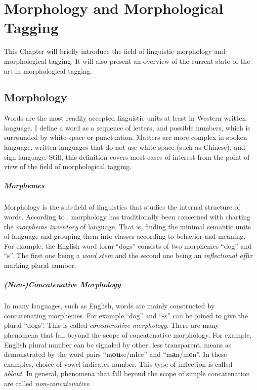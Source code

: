 \chapter{Morphology and Morphological Tagging}
\label{chap:morphology}

This Chapter will briefly introduce the field of linguistic
morphology and morphological tagging. It will also present an overview
of the current state-of-the-art in morphological tagging.

\section{Morphology}

Words are the most readily accepted linguistic units at least in
Western written language. I define a word as a sequence of letters,
and possible numbers, which is surrounded by white-space or
punctuation. Matters are more complex in spoken language, written
languages that do not use white space (such as Chinese), and sign
language. Still, this definition covers most cases of interest from
the point of view of the field of morphological tagging.

\paragraph{Morphemes} Morphology is the sub-field of linguistics that
studies the internal structure of words. According to \cite{Bybee85},
morphology has traditionally been concerned with charting the {\it
  morpheme inventory} of language. That is, finding the minimal
semantic units of language and grouping them into classes according to
behavior and meaning. For example, the English word form ``dogs''
consists of two morphemes ``dog'' and ``s''. The first one being a
{\it word stem} and the second one being an {\it inflectional affix}
marking plural number.

\paragraph{(Non-)Concatenative Morphology} In many languages, such as
English, words are mainly constructed by concatenating morphemes. For
example,``dog'' and ``-s'' can be joined to give the plural
``dogs''. This is called {\it concatenative morphology}. There are
many phenomena that fall beyond the scope of concatenative
morphology. For example, English plural number can be signaled by
other, less transparent, means as demonstrated by the word pairs
``m{\bf ou}se/m{\bf i}ce'' and ``m{\bf a}n/m{\bf e}n''. In these
examples, choice of vowel indicates number. This type of inflection is
called {\it ablaut}. In general, phenomena that fall beyond the scope
of simple concatenation are called {\it non-concatenative}.

